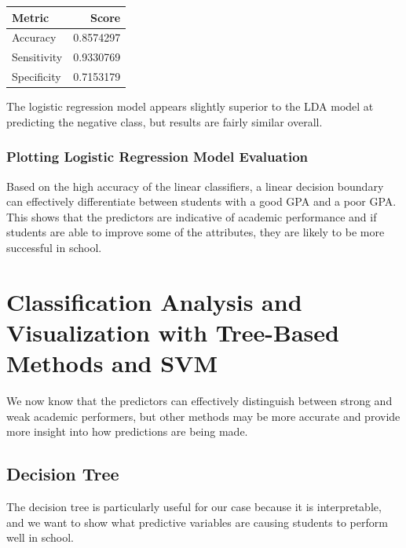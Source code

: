 \documentclass[
]{article}
\begin{document}
\begin{longtable}[]{@{}lr@{}}
\toprule\noalign{}
Metric & Score \\
\midrule\noalign{}
\endhead
\bottomrule\noalign{}
\endlastfoot
Accuracy & 0.8574297 \\
Sensitivity & 0.9330769 \\
Specificity & 0.7153179 \\
\end{longtable}

The logistic regression model appears slightly superior to the LDA model
at predicting the negative class, but results are fairly similar
overall.

\subsubsection{Plotting Logistic Regression Model
Evaluation}\label{plotting-logistic-regression-model-evaluation}

Based on the high accuracy of the linear classifiers, a linear decision
boundary can effectively differentiate between students with a good GPA
and a poor GPA. This shows that the predictors are indicative of
academic performance and if students are able to improve some of the
attributes, they are likely to be more successful in school.

\section{Classification Analysis and Visualization with Tree-Based
Methods and
SVM}\label{classification-analysis-and-visualization-with-tree-based-methods-and-svm}

We now know that the predictors can effectively distinguish between
strong and weak academic performers, but other methods may be more
accurate and provide more insight into how predictions are being made.

\subsection{Decision Tree}\label{decision-tree}

The decision tree is particularly useful for our case because it is
interpretable, and we want to show what predictive variables are causing
students to perform well in school.
\end{document}
